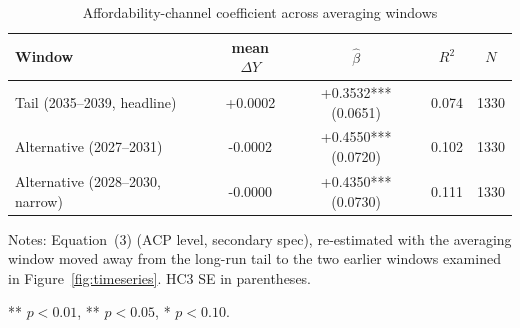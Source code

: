 \begin{table}[htbp]
\centering
\caption{Affordability-channel coefficient across averaging windows}
\label{tab:window_robustness}
\begin{threeparttable}
\begin{tabular}{lcccc}
\toprule
Window & mean $\Delta Y$ & $\hat{\beta}$ & $R^2$ & $N$ \\
\midrule
Tail (2035--2039, headline) & +0.0002 & +0.3532*** (0.0651) & 0.074 & 1330 \\
Alternative (2027--2031) & -0.0002 & +0.4550*** (0.0720) & 0.102 & 1330 \\
Alternative (2028--2030, narrow) & -0.0000 & +0.4350*** (0.0730) & 0.111 & 1330 \\
\bottomrule
\end{tabular}
\begin{tablenotes}
\footnotesize
\item Notes: Equation~(3) (ACP level, secondary spec), re-estimated with the averaging window moved away from the long-run tail to the two earlier windows examined in Figure~\ref{fig:timeseries}. HC3 SE in parentheses.
\item *** $p<0.01$, ** $p<0.05$, * $p<0.10$.
\end{tablenotes}
\end{threeparttable}
\end{table}